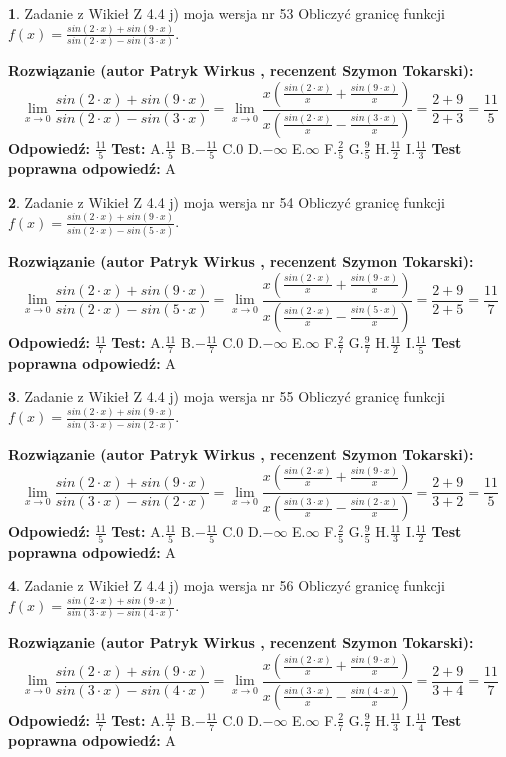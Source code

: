 \documentclass[12pt, a4paper]{article}
\theoremstyle{definition} %
\newtheorem{zad}{}
\newcommand{\zadStart}[1]{\begin{zad}#1\newline}
\newcommand{\zadStop}{\end{zad}}
\newcommand{\rozwStart}[2]{\noindent \textbf{Rozwiązanie (autor #1 , recenzent #2): }\newline}
\newcommand{\rozwStop}{\newline}
\newcommand{\odpStart}{\noindent \textbf{Odpowiedź:}\newline}
\newcommand{\odpStop}{\newline}
\newcommand{\testStart}{\noindent \textbf{Test:}\newline}
\newcommand{\testStop}{\newline}
\newcommand{\kluczStart}{\noindent \textbf{Test poprawna odpowiedź:}\newline}
\newcommand{\kluczStop}{\newline}
\begin{document}
\zadStart{Zadanie z Wikieł Z 4.4 j) moja wersja nr 53}
Obliczyć granicę funkcji $f(x)=\frac{sin(2\cdot x) +sin(9\cdot x)}{sin(2\cdot x) -sin(3\cdot x)}$.
\zadStop
\rozwStart{Patryk Wirkus}{Szymon Tokarski}
$$\lim\limits_{x\to 0}\frac{sin(2\cdot x) +sin(9\cdot x)}{sin(2\cdot x) -sin(3\cdot x)}=\lim\limits_{x\to 0}\frac{x(\frac{sin(2\cdot x)}{x}+\frac{sin(9\cdot x)}{x})}{x(\frac{sin(2\cdot x)}{x}-\frac{sin(3\cdot x)}{x})}=\frac{2+9}{2+3} = \frac{11}{5}$$
\rozwStop
\odpStart
$\frac{11}{5}$
\odpStop
\testStart
A.$\frac{11}{5}$
B.$-\frac{11}{5}$
C.$0$
D.$-\infty$
E.$\infty$
F.$\frac{2}{5}$
G.$\frac{9}{5}$
H.$\frac{11}{2}$
I.$\frac{11}{3}$
\testStop
\kluczStart
A
\kluczStop



\zadStart{Zadanie z Wikieł Z 4.4 j) moja wersja nr 54}
Obliczyć granicę funkcji $f(x)=\frac{sin(2\cdot x) +sin(9\cdot x)}{sin(2\cdot x) -sin(5\cdot x)}$.
\zadStop
\rozwStart{Patryk Wirkus}{Szymon Tokarski}
$$\lim\limits_{x\to 0}\frac{sin(2\cdot x) +sin(9\cdot x)}{sin(2\cdot x) -sin(5\cdot x)}=\lim\limits_{x\to 0}\frac{x(\frac{sin(2\cdot x)}{x}+\frac{sin(9\cdot x)}{x})}{x(\frac{sin(2\cdot x)}{x}-\frac{sin(5\cdot x)}{x})}=\frac{2+9}{2+5} = \frac{11}{7}$$
\rozwStop
\odpStart
$\frac{11}{7}$
\odpStop
\testStart
A.$\frac{11}{7}$
B.$-\frac{11}{7}$
C.$0$
D.$-\infty$
E.$\infty$
F.$\frac{2}{7}$
G.$\frac{9}{7}$
H.$\frac{11}{2}$
I.$\frac{11}{5}$
\testStop
\kluczStart
A
\kluczStop



\zadStart{Zadanie z Wikieł Z 4.4 j) moja wersja nr 55}
Obliczyć granicę funkcji $f(x)=\frac{sin(2\cdot x) +sin(9\cdot x)}{sin(3\cdot x) -sin(2\cdot x)}$.
\zadStop
\rozwStart{Patryk Wirkus}{Szymon Tokarski}
$$\lim\limits_{x\to 0}\frac{sin(2\cdot x) +sin(9\cdot x)}{sin(3\cdot x) -sin(2\cdot x)}=\lim\limits_{x\to 0}\frac{x(\frac{sin(2\cdot x)}{x}+\frac{sin(9\cdot x)}{x})}{x(\frac{sin(3\cdot x)}{x}-\frac{sin(2\cdot x)}{x})}=\frac{2+9}{3+2} = \frac{11}{5}$$
\rozwStop
\odpStart
$\frac{11}{5}$
\odpStop
\testStart
A.$\frac{11}{5}$
B.$-\frac{11}{5}$
C.$0$
D.$-\infty$
E.$\infty$
F.$\frac{2}{5}$
G.$\frac{9}{5}$
H.$\frac{11}{3}$
I.$\frac{11}{2}$
\testStop
\kluczStart
A
\kluczStop



\zadStart{Zadanie z Wikieł Z 4.4 j) moja wersja nr 56}
Obliczyć granicę funkcji $f(x)=\frac{sin(2\cdot x) +sin(9\cdot x)}{sin(3\cdot x) -sin(4\cdot x)}$.
\zadStop
\rozwStart{Patryk Wirkus}{Szymon Tokarski}
$$\lim\limits_{x\to 0}\frac{sin(2\cdot x) +sin(9\cdot x)}{sin(3\cdot x) -sin(4\cdot x)}=\lim\limits_{x\to 0}\frac{x(\frac{sin(2\cdot x)}{x}+\frac{sin(9\cdot x)}{x})}{x(\frac{sin(3\cdot x)}{x}-\frac{sin(4\cdot x)}{x})}=\frac{2+9}{3+4} = \frac{11}{7}$$
\rozwStop
\odpStart
$\frac{11}{7}$
\odpStop
\testStart
A.$\frac{11}{7}$
B.$-\frac{11}{7}$
C.$0$
D.$-\infty$
E.$\infty$
F.$\frac{2}{7}$
G.$\frac{9}{7}$
H.$\frac{11}{3}$
I.$\frac{11}{4}$
\testStop
\kluczStart
A
\kluczStop
\end{document}
